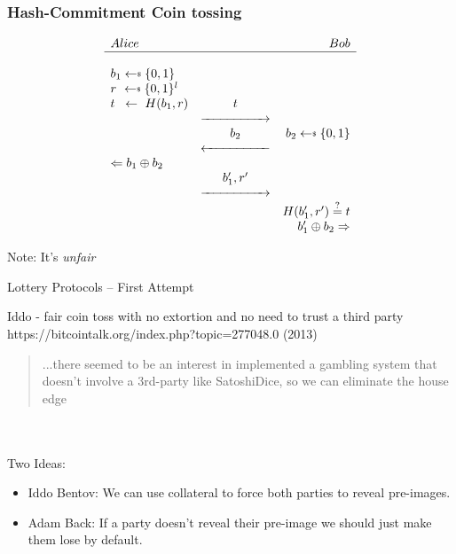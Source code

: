 \documentclass{beamer}
\newcommand\getsdollar{\mathrel{{\leftarrow}\vcenter{\hbox{\tiny\rmfamily\upshape\$}}}}
\begin{document}
\begin{frame}
\frametitle{Hash-Commitment Coin tossing}
\begin{figure}[!htb]
    \centering
    \[
\begin{array}{l c r}
Alice & & Bob \\
\hline \\
b_1 \getsdollar{} \{0,1\} & & \\
r_{\ } \getsdollar{} \{0,1\}^l & & \\
t_{\hspace{0.5em} } \gets{\ } H(b_1,r) & t & \\
& \xrightarrow{\hspace{5em}} & \\
 &  b_2 & b_2 \getsdollar{}\{0,1\} \\
 & \xleftarrow{\hspace{5em}} & \\
 \Leftarrow b_1 \oplus b_2 & & \\
 &  b_1', r'  & \\
 & \xrightarrow{\hspace{5em}} & \\
 &  & H(b_1',r') \stackrel{?}{=} t \\
 & &  b_1' \oplus b_2 \Rightarrow
\end{array}
\]
\end{figure}

Note: It's \textit{unfair}
\end{frame}

\begin{frame}{Lottery Protocols -- First Attempt}

    Iddo - fair coin toss with no extortion and no need to trust a third party
    https://bitcointalk.org/index.php?topic=277048.0 (2013)

    \begin{quote}
        ...there seemed to be an interest in implemented a gambling system that doesn't involve a 3rd-party like SatoshiDice, so we can eliminate the house edge
    \end{quote}
    
    \pause
    \\
    \\
   Two Ideas:
    
    \begin{itemize}
        \item Iddo Bentov: We can use collateral to force both parties to reveal pre-images.
        \item Adam Back: If a party doesn't reveal their pre-image we should just make them lose by default.
    \end{itemize}
\end{frame}
\end{document}
